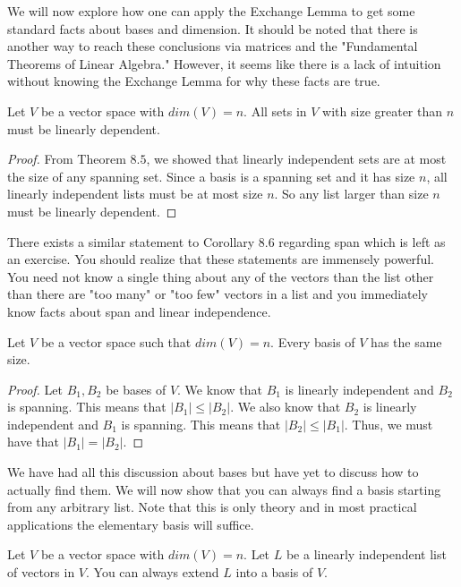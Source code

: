 We will now explore how one can apply the Exchange Lemma to get some standard facts about bases and dimension. It should be noted that there is another way to reach these conclusions via matrices and the "Fundamental Theorems of Linear Algebra." However, it seems like there is a lack of intuition without knowing the Exchange Lemma for why these facts are true.
\begin{corollary}
    Let $V$ be a vector space with $dim(V)=n$. All sets in $V$ with size greater than $n$ must be linearly dependent.
\end{corollary}
\begin{proof}
    From Theorem $8.5$, we showed that linearly independent sets are at most the size of any spanning set. Since a basis is a spanning set and it has size $n$, all linearly independent lists must be at most size $n$. So any list larger than size $n$ must be linearly dependent.
\end{proof}
There exists a similar statement to Corollary 8.6 regarding span which is left as an exercise. You should realize that these statements are immensely powerful. You need not know a single thing about any of the vectors than the list other than there are "too many" or "too few" vectors in a list and you immediately know facts about span and linear independence.
\begin{theorem}
    Let $V$ be a vector space such that $dim(V)=n$. Every basis of $V$ has the same size.
\end{theorem}
\begin{proof}
    Let $B_1, B_2$ be bases of $V$. We know that $B_1$ is linearly independent and $B_2$ is spanning. This means that $|B_1|\leq |B_2|$. We also know that $B_2$ is linearly independent and $B_1$ is spanning. This means that $|B_2|\leq |B_1|$. Thus, we must have that $|B_1|=|B_2|$.
\end{proof}
We have had all this discussion about bases but have yet to discuss how to actually find them. We will now show that you can always find a basis starting from any arbitrary list. Note that this is only theory and in most practical applications the elementary basis will suffice.
\begin{theorem}
    Let $V$ be a vector space with $dim(V)=n$. Let $L$ be a linearly independent list of vectors in $V$. You can always extend $L$ into a basis of $V$.
\end{theorem}
